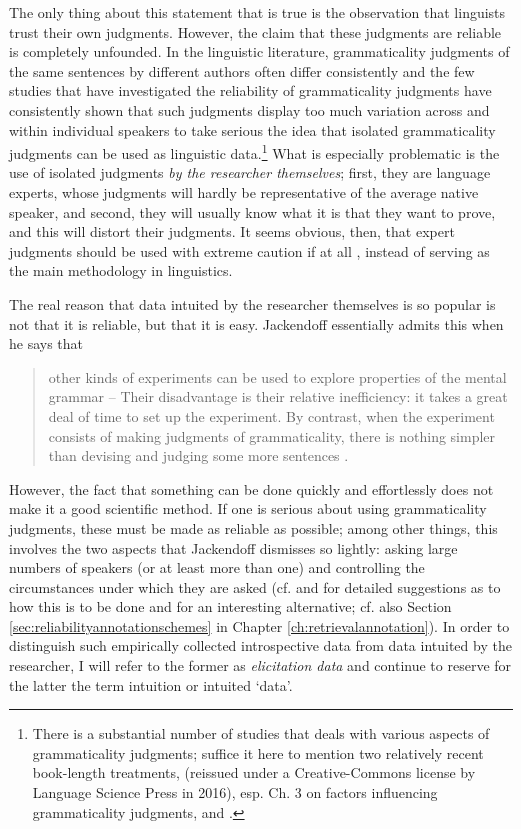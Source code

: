 The only thing about this statement that is true is the observation that linguists trust their own judgments. However, the claim that these judgments are reliable is completely unfounded. In the linguistic literature, grammaticality judgments of the same sentences by different authors often differ consistently and the few studies that have investigated the reliability of grammaticality judgments have consistently shown that such judgments display too much variation across and within individual speakers to take serious the idea that isolated grammaticality judgments can be used as linguistic data.\footnote{There is a substantial number of studies that deals with various aspects of grammaticality judgments; suffice it here to mention two relatively recent book-length treatments, \citet{schutze_empirical_1996} (reissued under a Creative-Commons license by Language Science Press in 2016), esp. Ch. 3 on factors influencing grammaticality judgments, and \citet{cowart_experimental_1997}.} What is especially problematic is the use of isolated judgments \emph{by the researcher themselves}; first, they are language experts, whose judgments will hardly be representative of the average native speaker, and second, they will usually know what it is that they want to prove, and this will distort their judgments. It seems obvious, then, that expert judgments should be used with extreme caution \citep[cf.][]{labov_when_1996} if at all \citep{schutze_empirical_1996}, instead of serving as the main methodology in linguistics.

The real reason that data intuited by the researcher themselves is so popular is not that it is reliable, but that it is easy. Jackendoff essentially admits this when he says that

\begin{quote}
other kinds of experiments can be used to explore properties of the mental grammar -- Their disadvantage is their relative inefficiency: it takes a great deal of time to set up the experiment. By contrast, when the experiment consists of making judgments of grammaticality, there is nothing simpler than devising and judging some more sentences \citep[49]{jackendoff_patterns_1994}.
\end{quote}

However, the fact that something can be done quickly and effortlessly does not make it a good scientific method. If one is serious about using grammaticality judgments, these must be made as reliable as possible; among other things, this involves the two aspects that Jackendoff dismisses so lightly: asking large numbers of speakers (or at least more than one) and controlling the circumstances under which they are asked (cf. \citet{schutze_empirical_1996} and \citet{cowart_experimental_1997} for detailed suggestions as to how this is to be done and \citet{bender_boundaries_2005} for an interesting alternative; cf. also Section \ref{sec:reliabilityannotationschemes} in Chapter \ref{ch:retrievalannotation}). In order to distinguish such empirically collected introspective data from data intuited by the researcher, I will refer to the former as \emph{elicitation data} and continue to reserve for the latter the term intuition or intuited `data'.


